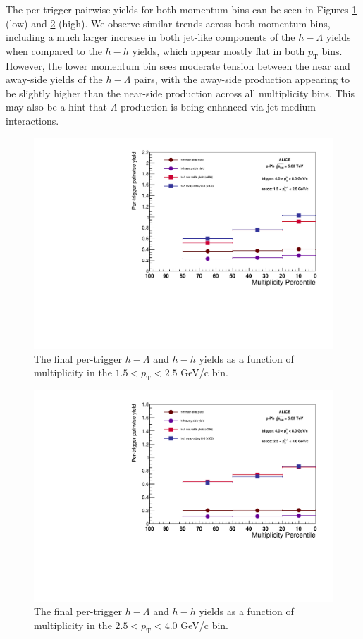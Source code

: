 \documentclass[ALICE,manyauthors]{ALICE_analysis_notes}
\begin{document}
\begin{itemize}
 The per-trigger pairwise yields for both momentum bins can be seen in Figures \ref{low_momentum_yield} (low) and \ref{high_momentum_yield} (high). We observe similar trends across both momentum bins, including a much larger increase in both jet-like components of the $h-\Lambda$ yields when compared to the $h-h$ yields, which appear mostly flat in both $p_\text{T}$ bins. However, the lower momentum bin sees moderate tension between the near and away-side yields of the $h-\Lambda$ pairs, with the away-side production appearing to be slightly higher than the near-side production across all multiplicity bins. This may also be a hint that $\Lambda$ production is being enhanced via jet-medium interactions.

\begin{figure}[ht]
\centering
\includegraphics[width=5in]{figures/per_trigger_yields_15_25.pdf}
\caption{The final per-trigger $h-\Lambda$ and $h-h$ yields as a function of multiplicity in the $1.5 < p_{\text{T}} < 2.5$ GeV/c bin.}
\label{low_momentum_yield}
\end{figure}

\begin{figure}[ht]
\centering
\includegraphics[width=5in]{figures/per_trigger_yields_25_40.pdf}
\caption{The final per-trigger $h-\Lambda$ and $h-h$ yields as a function of multiplicity in the $2.5 < p_{\text{T}} < 4.0$ GeV/c bin.}
\label{high_momentum_yield}
\end{figure}



\end{itemize}
\end{document}
